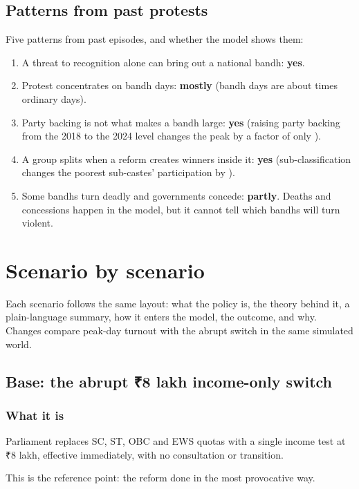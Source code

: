 \documentclass[11pt,a4paper]{article}
\newcommand{\rupee}{{\rupeefont ₹}}
\begin{document}
\subsection{Patterns from past protests}
Five patterns from past episodes, and whether the model shows them:
\begin{enumerate}
\item A threat to recognition alone can bring out a national bandh: \textbf{yes}.
\item Protest concentrates on bandh days: \textbf{mostly} (bandh days are about \FactBandhToOrdinary{} times ordinary days).
\item Party backing is not what makes a bandh large: \textbf{yes} (raising party backing from the 2018 to the 2024 level changes the peak by a factor of only \FactBackingPeakRatio).
\item A group splits when a reform creates winners inside it: \textbf{yes} (sub-classification changes the poorest sub-castes' participation by \FactDeprivedChange).
\item Some bandhs turn deadly and governments concede: \textbf{partly}. Deaths and concessions happen in the model, but it cannot tell which bandhs will turn violent.
\end{enumerate}

\section{Scenario by scenario}

Each scenario follows the same layout: what the policy is, the theory behind it, a plain-language summary, how it enters the model, the outcome, and why. Changes compare peak-day turnout with the abrupt switch in the same simulated world.

\subsection{Base: the abrupt \rupee8 lakh income-only switch}
\subsubsection{What it is}
Parliament replaces SC, ST, OBC and EWS quotas with a single income test at \rupee8 lakh, effective immediately, with no consultation or transition.
\begin{plainwords}This is the reference point: the reform done in the most provocative way.\end{plainwords}
\end{document}
